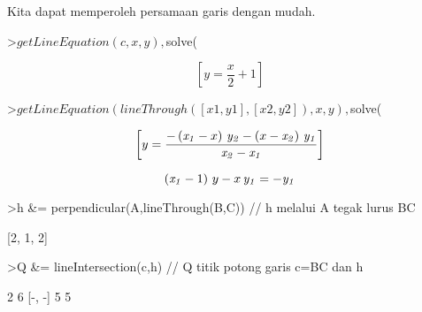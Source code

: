 \documentclass[a4paper,10pt]{article}
\begin{document}
\begin{eulernotebook}
\begin{eulercomment}
\begin{eulercomment}
\begin{eulercomment}
\begin{eulercomment}
\begin{eulercomment}
\begin{eulercomment}
\begin{eulercomment}
\begin{eulercomment}
\begin{eulercomment}
\begin{eulercomment}
\begin{eulercomment}
\begin{eulercomment}
\begin{eulercomment}
\begin{eulercomment}
\begin{eulercomment}
\begin{eulercomment}
\begin{eulercomment}
\begin{eulercomment}
\begin{euleroutput}
\end{euleroutput}
\begin{eulercomment}
Kita dapat memperoleh persamaan garis dengan mudah.
\end{eulercomment}
\begin{eulerprompt}
>$getLineEquation(c,x,y), $solve(%
\end{eulerprompt}
\begin{eulerformula}
\[
\left[ y=\frac{x}{2}+1 \right] 
\]
\end{eulerformula}
\begin{eulerprompt}
>$getLineEquation(lineThrough([x1,y1],[x2,y2]),x,y), $solve(%
\end{eulerprompt}
\begin{eulerformula}
\[
\left[ y=\frac{-\left({\it x_1}-x\right)\,{\it y_2}-\left(x-  {\it x_2}\right)\,{\it y_1}}{{\it x_2}-{\it x_1}} \right] 
\]
\end{eulerformula}
\begin{eulerformula}
\[
\left({\it x_1}-1\right)\,y-x\,{\it y_1}=-{\it y_1}
\]
\end{eulerformula}
\begin{eulerprompt}
>h &= perpendicular(A,lineThrough(B,C)) // h melalui A tegak lurus BC
\end{eulerprompt}
\begin{euleroutput}
  
                                [2, 1, 2]
  
\end{euleroutput}
\begin{eulerprompt}
>Q &= lineIntersection(c,h) // Q titik potong garis c=BC dan h
\end{eulerprompt}
\begin{euleroutput}
  
                                   2  6
                                  [-, -]
                                   5  5
  

\end{euleroutput}
\end{eulercomment}
\end{eulercomment}
\end{eulercomment}
\end{eulercomment}
\end{eulercomment}
\end{eulercomment}
\end{eulercomment}
\end{eulercomment}
\end{eulercomment}
\end{eulercomment}
\end{eulercomment}
\end{eulercomment}
\end{eulercomment}
\end{eulercomment}
\end{eulercomment}
\end{eulercomment}
\end{eulercomment}
\end{eulercomment}
\end{eulernotebook}
\end{document}
